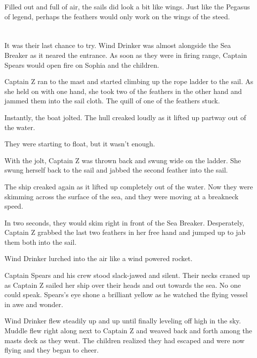 \documentclass[12pt]{extbook}
\begin{document}
  Filled out and full of air, the sails did look a bit like wings. Just
  like the Pegasus of legend, perhaps the feathers would only work on the
  wings of the steed.
  
  \section{}\label{section-39}
  
  It was their last chance to try. Wind Drinker was almost alongside the
  Sea Breaker as it neared the entrance. As soon as they were in firing
  range, Captain Spears would open fire on Sophia and the children.
  
  Captain Z ran to the mast and started climbing up the rope ladder to the
  sail. As she held on with one hand, she took two of the feathers in the
  other hand and jammed them into the sail cloth. The quill of one of the
  feathers stuck.
  
  Instantly, the boat jolted. The hull creaked loudly as it lifted up
  partway out of the water.
  
  They were starting to float, but it wasn't enough.
  
  With the jolt, Captain Z was thrown back and swung wide on the ladder.
  She swung herself back to the sail and jabbed the second feather into
  the sail.
  
  The ship creaked again as it lifted up completely out of the water. Now
  they were skimming across the surface of the sea, and they were moving
  at a breakneck speed.
  
  In two seconds, they would skim right in front of the Sea Breaker.
  Desperately, Captain Z grabbed the last two feathers in her free hand
  and jumped up to jab them both into the sail.
  
  Wind Drinker lurched into the air like a wind powered rocket.
  
  Captain Spears and his crew stood slack-jawed and silent. Their necks
  craned up as Captain Z sailed her ship over their heads and out towards
  the sea. No one could speak. Spears's eye shone a brilliant yellow as he
  watched the flying vessel in awe and wonder.
  
  Wind Drinker flew steadily up and up until finally leveling off high in
  the sky. Muddle flew right along next to Captain Z and weaved back and
  forth among the masts deck as they went. The children realized they had
  escaped and were now flying and they began to cheer.
  
\end{document}
